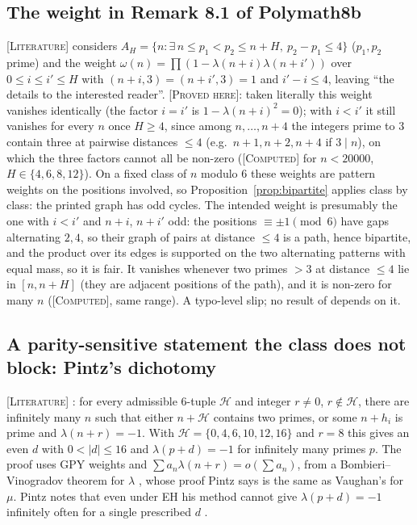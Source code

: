 \documentclass[11pt]{amsart}
\theoremstyle{definition}
\theoremstyle{remark}
\newcommand{\lbl}[1]{\textup{\textsc{[#1]}}}
\begin{document}
\subsection{The weight in Remark 8.1 of Polymath8b}\label{subsec:rem81}
\lbl{Literature} \cite[Remark~8.1, p.~70]{PM8b} considers
$A_H=\{n:\exists\,n\le p_1<p_2\le n+H,\ p_2-p_1\le4\}$ ($p_1,p_2$ prime) and
the weight
$\omega(n)=\prod\left(1-\lambda(n+i)\lambda(n+i')\right)$ over
$0\le i\le i'\le H$ with $(n+i,3)=(n+i',3)=1$ and $i'-i\le4$, leaving ``the
details to the interested reader''. \lbl{Proved here}: taken literally this
weight vanishes identically (the factor $i=i'$ is $1-\lambda(n+i)^2=0$); with
$i<i'$ it still vanishes for every $n$ once $H\ge4$, since among
$n,\dots,n+4$ the integers prime to $3$ contain three at pairwise distances
$\le4$ (e.g.\ $n+1,n+2,n+4$ if $3\mid n$), on which the three factors cannot
all be non-zero (\lbl{Computed} for $n<20000$, $H\in\{4,6,8,12\}$). On a
fixed class of $n$ modulo $6$ these weights are pattern weights on the
positions involved, so Proposition~\ref{prop:bipartite} applies class by
class: the printed graph has odd cycles. The intended weight is presumably the one with $i<i'$ and $n+i$, $n+i'$ odd: the
positions $\equiv\pm1\pmod6$ have gaps alternating $2,4$, so their graph of
pairs at distance $\le4$ is a path, hence bipartite, and the product over its
edges is supported on the two alternating patterns with equal mass, so it is
fair. It vanishes whenever two primes $>3$ at distance $\le4$ lie in
$[n,n+H]$ (they are adjacent positions of the path), and it is non-zero for
many $n$ (\lbl{Computed}, same range). A typo-level slip; no result of
\cite{PM8b} depends on it.

\subsection{A parity-sensitive statement the class does not block: Pintz's dichotomy}\label{subsec:pintz}

\lbl{Literature} \cite[Theorems~1, 3 and \S3, pp.~2--3, 6--10]{Pi10}: for every
admissible $6$-tuple $\mathcal H$ and integer $r\ne0$, $r\notin\mathcal H$, there are
infinitely many $n$ such that either $n+\mathcal H$ contains two primes, or
some $n+h_i$ is prime and $\lambda(n+r)=-1$. With $\mathcal H=\{0,4,6,10,12,16\}$
and $r=8$ this gives an even $d$ with $0<|d|\le16$ and $\lambda(p+d)=-1$ for
infinitely many primes $p$. The proof uses GPY weights and
$\sum a_n\lambda(n+r)=o(\sum a_n)$, from a Bombieri--Vinogradov theorem for
$\lambda$ \cite[Lemmas~3, 4]{Pi10}, whose proof Pintz says is the same as
Vaughan's for $\mu$. Pintz notes that even under EH his method cannot give
$\lambda(p+d)=-1$ infinitely often for a single prescribed $d$ \cite[p.~3]{Pi10}.
\end{document}
